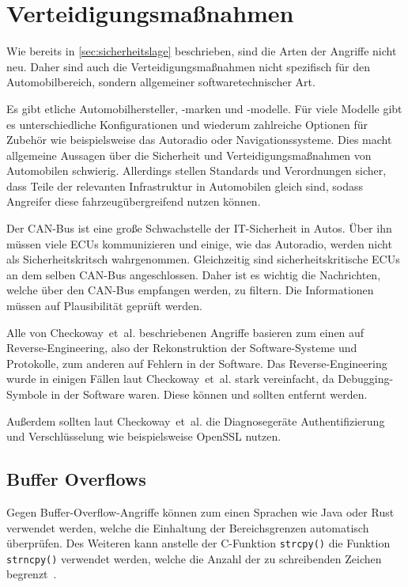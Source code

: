 \chapter{Verteidigungsmaßnahmen}\label{ch:defense}
Wie bereits in \cref{sec:sicherheitslage} beschrieben, sind die Arten der
Angriffe nicht neu. Daher sind auch die Verteidigungsmaßnahmen nicht
spezifisch für den Automobilbereich, sondern allgemeiner softwaretechnischer
Art.

Es gibt etliche Automobilhersteller, -marken und -modelle. Für viele Modelle
gibt es unterschiedliche Konfigurationen und wiederum zahlreiche Optionen für
Zubehör wie beispielsweise das Autoradio oder Navigationssysteme. Dies macht
allgemeine Aussagen über die Sicherheit und Verteidigungsmaßnahmen von
Automobilen schwierig. Allerdings stellen Standards und Verordnungen sicher,
dass Teile der relevanten Infrastruktur in Automobilen gleich sind, sodass
Angreifer diese fahrzeugübergreifend nutzen können.

Der CAN-Bus ist eine große Schwachstelle der IT-Sicherheit in Autos. Über ihn
müssen viele ECUs kommunizieren und einige, wie das Autoradio, werden nicht als
Sicherheitskritsch wahrgenommen. Gleichzeitig sind sicherheitskritische ECUs an
dem selben CAN-Bus angeschlossen. Daher ist es wichtig die Nachrichten, welche
über den CAN-Bus empfangen werden, zu filtern. Die Informationen müssen auf
Plausibilität geprüft werden.

Alle von Checkoway~et~al. beschriebenen Angriffe basieren zum einen auf
Reverse-Engineering, also der Rekonstruktion der Software-Systeme und
Protokolle, zum anderen auf Fehlern in der Software. Das Reverse-Engineering
wurde in einigen Fällen laut Checkoway~et~al. stark vereinfacht, da
Debugging-Symbole in der Software waren. Diese können und sollten
entfernt werden.

Außerdem sollten laut Checkoway~et~al. die Diagnosegeräte Authentifizierung und
Verschlüsselung wie beispielsweise OpenSSL nutzen.

\section{Buffer Overflows}
Gegen Buffer-Overflow-Angriffe können zum einen Sprachen wie Java oder Rust
verwendet werden, welche die Einhaltung der Bereichsgrenzen automatisch
überprüfen. Des Weiteren kann anstelle der C-Funktion \verb+strcpy()+ die
Funktion \verb+strncpy()+ verwendet werden, welche die Anzahl der zu
schreibenden Zeichen begrenzt~\cite{Eckert2012}.

